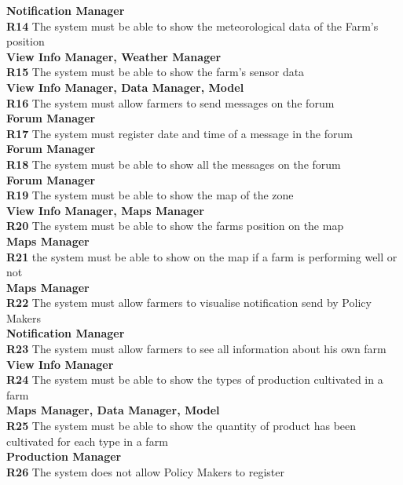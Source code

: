 \indent \textbf{Notification Manager}\\
\textbf{R14} The system must be able to show the meteorological data of the Farm’s position\\
\indent \textbf{View Info Manager, Weather Manager}\\
\textbf{R15} The system must be able to show the farm’s sensor data \\
\indent \textbf{View Info Manager, Data Manager, Model}\\
\textbf{R16} The system must allow farmers to send messages on the forum\\
\indent \textbf{Forum Manager}\\
\textbf{R17} The system must register date and time of a message in the forum\\
\indent \textbf{Forum Manager}\\
\textbf{R18} The system must be able to show all the messages on the forum\\
\indent \textbf{Forum Manager}\\
\textbf{R19} The system must be able to show the map of the zone\\
\indent \textbf{View Info Manager, Maps Manager}\\
\textbf{R20} The system must be able to show the farms position on the map\\
\indent \textbf{Maps Manager}\\
\textbf{R21} the system must be able to show on the map if a farm is performing well or not \\
\indent \textbf{Maps Manager}\\
\textbf{R22} The system must allow farmers to visualise notification send by Policy Makers\\
\indent \textbf{Notification Manager}\\
\textbf{R23} The system must allow farmers to see all information about his own farm\\
\indent \textbf{View Info Manager}\\
\textbf{R24} The system must be able to show the types of production cultivated in a farm\\
\indent \textbf{Maps Manager, Data Manager, Model}\\
\textbf{R25} The system must be able to show the quantity of product has been cultivated for each type in a farm\\
\indent \textbf{Production Manager}\\
\textbf{R26} The system does not allow Policy Makers to register\\
